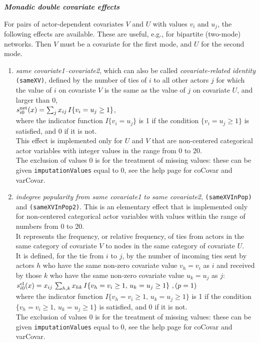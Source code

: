 \documentclass[a4paper,fleqn,11pt]{article}
\newcommand{\+}{\, + \,}
\newcommand{\sfn}[1]{\textsf{#1}}
\newcommand{\vit}{\theenumi}
\newcounter{savenumi}
\begin{document}
\noindent
\textbf{\emph{Monadic double covariate effects}}
\medskip


\noindent
For pairs of actor-dependent covariates $V$ and $U$ with values  $v_i$ and $u_j$,
the following effects are available.
These are useful, e.g., for bipartite (two-mode) networks.
 Then $V$ must be a covariate for the first mode, and $U$ for the second mode.

\begin{enumerate}
\setcounter{enumi}{\value{savenumi}}

 \item \emph{same covariate1--covariate2}, which can also be called {\em covariate-related identity}
 \texttt{(sameXV)},  defined by the
 number of ties of $i$ to all other actors $j$ for which the value of $i$
 on covariate $V$ is the same as the value of $j$ on covariate $U$,
 and larger than 0,\\[0.3em]
 $s^{\rm net}_{i\vit}(x) = \sum_j x_{ij}\, I\{v_i = u_j \geq 1\} $,\\[0.3em]
 where the indicator function $I\{v_i = u_j \} $ is 1 if the condition $\{v_i = u_j \geq 1\} $
 is satisfied, and 0 if it is not.\\
 This effect is implemented only for $U$ and $V$ that are non-centered categorical
  actor variables with integer values in the range from 0 to 20.\\
  The exclusion of values 0 is for the treatment of missing values:
  these can be given \texttt{imputationValues}  equal to 0,
  see the help page for \sfn{coCovar} and \sfn{varCovar}.

 \item \emph{indegree popularity from same covariate1 to same covariate2},
 \texttt{(sameXVInPop)} and \texttt{(sameXVInPop2)}.
  This is an elementary effect that is implemented only for non-centered categorical
  actor variables with values within the range of numbers from 0 to 20.\\
  It represents the frequency, or relative frequency, of ties from actors in the
  same category of covariate $V$ to nodes in the same category of covariate $U$.\\
 It is defined, for the tie from $i$ to $j$, by the number of
incoming ties sent by actors $h$ who have the same non-zero covariate value $v_h = v_i$ as $i$
 and received by those $k$ who have the same non-zero covariate value $u_k = u_j$ as $j$:\\[0.3em]
 $s^{\rm el}_{i\vit}(x) =  x_{ij}\, \sum_{h,k} x_{hk}\, I\{v_h = v_i \geq 1,\, u_k=u_j \geq 1\}  \ ,
             \hfill (p=1) $\\[0.3em]
 where the indicator function $ I\{v_h = v_i\geq 1,\, u_k=u_j \geq 1 \} $ is 1
 if the condition $\{v_h = v_i \geq 1,\, u_k=u_j \geq 1 \} $ is satisfied, and 0 if it is not.\\
  The exclusion of values 0 is for the treatment of missing values:
  these can be given \texttt{imputationValues}  equal to 0,
  see the help page for \sfn{coCovar} and \sfn{varCovar}.


\end{enumerate}
\end{document}
